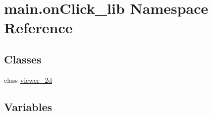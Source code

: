 \hypertarget{namespacemain_1_1on_click__lib}{\section{main.\-on\-Click\-\_\-lib Namespace Reference}
\label{namespacemain_1_1on_click__lib}
}
\subsection*{Classes}
\begin{DoxyCompactItemize}
\item 
class \hyperlink{classmain_1_1on_click__lib_1_1viewer__2d}{viewer\-\_\-2d}
\end{DoxyCompactItemize}
\subsection*{Variables}
